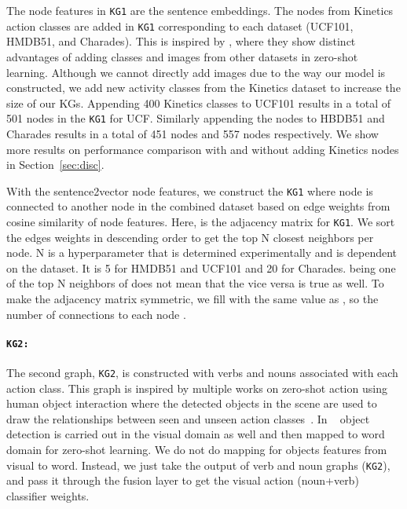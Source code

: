 The node features in \texttt{KG1} are the sentence embeddings. The nodes from Kinetics action classes are added in \texttt{KG1} corresponding to each dataset (UCF101, HMDB51, and Charades). This is inspired by \cite{xu2016multi,xu2015semantic}, where they show distinct advantages of adding classes and images from other datasets in zero-shot learning. Although we cannot directly add images due to the way our model is constructed, we add new activity classes from the Kinetics dataset to increase the size of our KGs. Appending 400 Kinetics classes to UCF101 results in a total of 501 nodes in the \texttt{KG1} for UCF. Similarly appending the nodes to HBDB51 and Charades results in a total of 451 nodes and 557 nodes respectively. We show more results on performance comparison with and without adding Kinetics nodes in Section~\ref{sec:disc}.

With the sentence2vector node features, we construct the \texttt{KG1} where node  is connected to another node  in the combined dataset based on edge weights  from cosine similarity of node features. Here,  is the adjacency matrix for \texttt{KG1}. We sort the edges weights in descending order to get the top N closest neighbors per node. N is a hyperparameter that is determined experimentally and is dependent on the dataset. It is 5 for HMDB51 and UCF101 and 20 for Charades.  being one of the top N neighbors of  does not mean that the vice versa is true as well. To make the adjacency matrix symmetric, we fill  with the same value as , so the number of connections to each node .

\paragraph{\texttt{\bf {KG2:}}} The second graph, \texttt{KG2}, is constructed with verbs and nouns associated with each action class. This graph is inspired by multiple works on zero-shot action using human object interaction where the detected objects in the scene are used to draw the relationships between seen and unseen action classes~\cite{gao2019know,jain2015objects2action}. In ~\cite{gao2019know} object detection is carried out in the visual domain as well and then mapped to word domain for zero-shot learning. We do not do mapping for objects features from visual to word. Instead, we just take the output of verb and noun graphs (\texttt{KG2}), and pass it through the fusion layer to get the visual action (noun+verb) classifier weights. 

